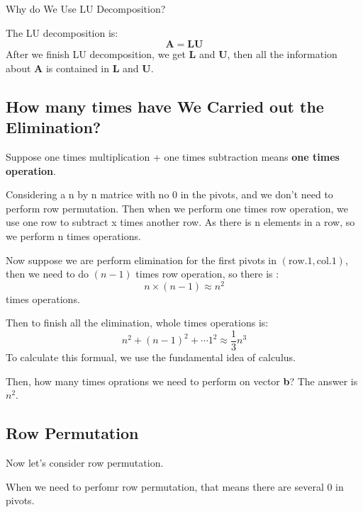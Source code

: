         \noindent Why do We Use LU Decomposition?

        The LU decomposition is:
            \begin{equation}
                \mathbf{A} = \mathbf{L} \mathbf{U}
            \end{equation}
        After we finish LU decomposition, we get \textbf{L} and \textbf{U},
        then all the information about \textbf{A} is contained in  \textbf{L} and \textbf{U}.

    \subsection{How many times have We Carried out the Elimination?}
        Suppose one times multiplication + one times subtraction means \textbf{one times operation}.
        
        Considering a n by n matrice with no 0 in the pivots, and we don't need to perform row permutation.
        Then when we perform one times row operation, we use one row to subtract x times another row.
        As there is n elements in a row, so we perform n times operations.

        Now suppose we are perform elimination for the first pivots in $\mathrm{(row.1, col.1)}$, 
        then we need to do $(n-1)$ times row operation, so there is :
         \begin{equation}
            n \times (n-1) \approx n^2 
         \end{equation}
        times operations.

        Then to finish all the elimination, whole times operations is:
            \begin{equation}
                n^2 + (n-1)^2 + \cdots 1^2 \approx \frac{1}{3}n^3 
            \end{equation}
        To calculate this formual, we use the fundamental idea of calculus.

        Then, how many times oprations we need to perform on vector \textbf{b}?
        The answer is $n^2$.

    \subsection{Row Permutation}
        Now let's consider row permutation.

        When we need to perfomr row permutation, that means there are several 0 in pivots.

